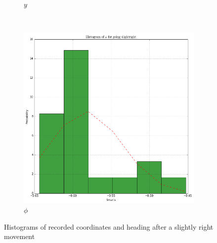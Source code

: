 \documentclass[paper=a4, fontsize=11pt]{scrartcl} %
\begin{document}
\begin{figure}[h!]
\begin{subfigure}[b]{0.3\textwidth}
            \caption{$y$}
        \end{subfigure}
        ~
        \begin{subfigure}[b]{0.3\textwidth}
            \setlength{\fboxsep}{0.5pt} %
            \setlength{\fboxrule}{0.5pt}
            \includegraphics[width=\textwidth,fbox]{images/histogram_3_phi_slightRight.png}
            \caption{$\phi$}
        \end{subfigure}
        \caption{Histograms of recorded coordinates and heading after a slightly right movement}
    \end{figure}

\newpage
\end{document}
